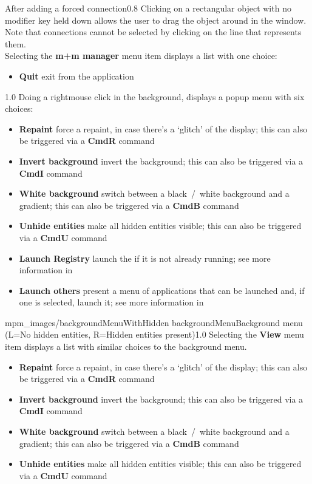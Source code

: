 %
{After adding a forced connection}{0.8}
\condPage{}
Clicking on a rectangular object with no modifier key held down allows the user to drag
the object around in the window.
Note that connections cannot be selected by clicking on the line that represents them.\\

Selecting the \textbf{m+m manager} menu item displays a list with one choice:
\begin{itemize}
\item\textbf{Quit} exit from the application
\end{itemize}
%
{1.0}
\condPage{}
Doing a right\longDash{}mouse click in the background, displays a popup menu with six
choices:
\begin{itemize}
\item\textbf{Repaint} force a repaint, in case there's a `glitch' of the display; this
can also be triggered via a \textbf{Cmd\longDash{}R} command
\item\exSp\textbf{Invert background} invert the background; this can also be triggered via
a \textbf{Cmd\longDash{}I} command
\item\exSp\textbf{White background} switch between a black~/~white background and a
gradient; this can also be triggered via a \textbf{Cmd\longDash{}B} command
\item\exSp\textbf{Unhide entities} make all hidden entities visible; this can also be
triggered via a \textbf{Cmd\longDash{}U} command
\item\exSp\textbf{Launch Registry} launch the \emph{\RS} if it is not already running; see
more information in\\
\item\exSp\textbf{Launch others \textellipsis} present a menu of applications that can be
launched and, if one is selected, launch it; see more information in
\end{itemize}
%
{mpm_images/backgroundMenuWithHidden}%
{backgroundMenu}{Background menu (L=No hidden entities, R=Hidden entities present)}{1.0}
\condPage{}
Selecting the \textbf{View} menu item displays a list with similar choices to the
background menu.
\begin{itemize}
\item\textbf{Repaint} force a repaint, in case there's a `glitch' of the display; this
can also be triggered via a \textbf{Cmd\longDash{}R} command
\item\exSp\textbf{Invert background} invert the background; this can also be triggered via
a \textbf{Cmd\longDash{}I} command
\item\exSp\textbf{White background} switch between a black~/~white background and a
gradient; this can also be triggered via a \textbf{Cmd\longDash{}B} command
\item\exSp\textbf{Unhide entities} make all hidden entities visible; this can also be
triggered via a \textbf{Cmd\longDash{}U} command
\end{itemize}
